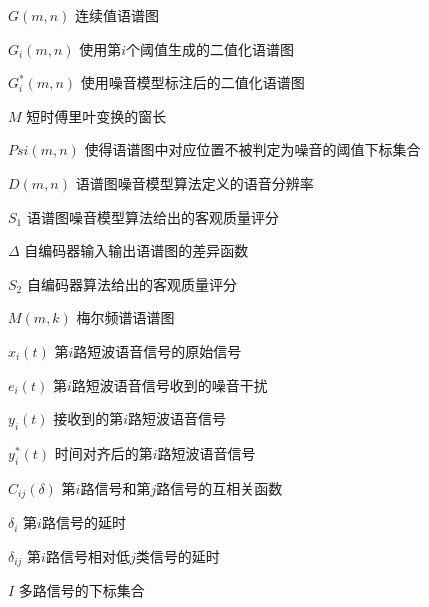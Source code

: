 
\begin{denotation}[3cm]
\item[$G(m,n)$]  连续值语谱图
\item[$G_i(m,n)$]  使用第$i$个阈值生成的二值化语谱图
\item[$G_i^*(m,n)$]  使用噪音模型标注后的二值化语谱图
\item[$M$]  短时傅里叶变换的窗长
\item[$Psi(m,n)$]  使得语谱图中对应位置不被判定为噪音的阈值下标集合
\item[$D(m,n)$]  语谱图噪音模型算法定义的语音分辨率
\item[$S_1$] 语谱图噪音模型算法给出的客观质量评分
\item[$\Delta$] 自编码器输入输出语谱图的差异函数
\item[$S_2$]    自编码器算法给出的客观质量评分
\item[$M(m,k)$]   梅尔频谱语谱图
\item[$x_i(t)$] 第$i$路短波语音信号的原始信号
\item[$e_i(t)$] 第$i$路短波语音信号收到的噪音干扰
\item[$y_i(t)$] 接收到的第$i$路短波语音信号
\item[$y_i^*(t)$] 时间对齐后的第$i$路短波语音信号
\item[$C_{ij}(\delta)$] 第$i$路信号和第$j$路信号的互相关函数
\item[$\delta_i$] 第$i$路信号的延时
\item[$\delta_{ij}$]  第$i$路信号相对低$j$类信号的延时
\item[$I$] 多路信号的下标集合
\end{denotation}
